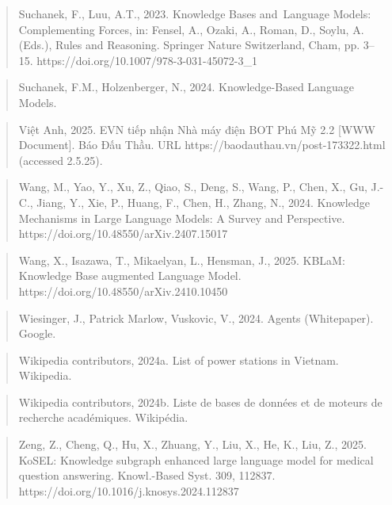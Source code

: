 \documentclass[a4paper,11pt]{report}
\begin{document}
\begin{quote}
Suchanek, F., Luu, A.T., 2023. Knowledge Bases and~Language Models: Complementing Forces, in: Fensel, A., Ozaki, A., Roman, D., Soylu, A. (Eds.), Rules and Reasoning. Springer Nature Switzerland, Cham, pp. 3--15. https://doi.org/10.1007/978-3-031-45072-3\_1
\end{quote}

\begin{quote}
Suchanek, F.M., Holzenberger, N., 2024. Knowledge-Based Language Models.
\end{quote}

\begin{quote}
Việt Anh, 2025. EVN tiếp nhận Nhà máy điện BOT Phú Mỹ 2.2 {[}WWW Document{]}. Báo Đấu Thầu. URL https://baodauthau.vn/post-173322.html (accessed 2.5.25).
\end{quote}

\begin{quote}
Wang, M., Yao, Y., Xu, Z., Qiao, S., Deng, S., Wang, P., Chen, X., Gu, J.-C., Jiang, Y., Xie, P., Huang, F., Chen, H., Zhang, N., 2024. Knowledge Mechanisms in Large Language Models: A Survey and Perspective. https://doi.org/10.48550/arXiv.2407.15017
\end{quote}

\begin{quote}
Wang, X., Isazawa, T., Mikaelyan, L., Hensman, J., 2025. KBLaM: Knowledge Base augmented Language Model. https://doi.org/10.48550/arXiv.2410.10450
\end{quote}

\begin{quote}
Wiesinger, J., Patrick Marlow, Vuskovic, V., 2024. Agents (Whitepaper). Google.
\end{quote}

\begin{quote}
Wikipedia contributors, 2024a. List of power stations in Vietnam. Wikipedia.
\end{quote}

\begin{quote}
Wikipedia contributors, 2024b. Liste de bases de données et de moteurs de recherche académiques. Wikipédia.
\end{quote}

\begin{quote}
Zeng, Z., Cheng, Q., Hu, X., Zhuang, Y., Liu, X., He, K., Liu, Z., 2025. KoSEL: Knowledge subgraph enhanced large language model for medical question answering. Knowl.-Based Syst. 309, 112837. https://doi.org/10.1016/j.knosys.2024.112837
\end{quote}



\end{document}
